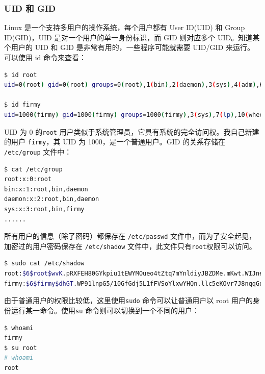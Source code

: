 \subsubsection{UID 和 GID}
\indent \setlength{\parindent}{2em}
\indent Linux 是一个支持多用户的操作系统，每个用户都有 User ID(UID) 和 Group ID(GID)，UID 是对一个用户的单一身份标识，而 GID 则对应多个 UID。知道某个用户的 UID 和 GID 是非常有用的，一些程序可能就需要 UID/GID 来运行。可以使用 id 命令来查看：
\begin{lstlisting}[language=bash, style=customStyleBashDark, caption=查看uid]
$ id root
uid=0(root) gid=0(root) groups=0(root),1(bin),2(daemon),3(sys),4(adm),6(disk),10(wheel),19(log)

$ id firmy
uid=1000(firmy) gid=1000(firmy) groups=1000(firmy),3(sys),7(lp),10(wheel),90(network),91(video),93(optical),95(storage),96(scanner),98(power),56(bumblebee)
\end{lstlisting}

\indent UID 为 0 的\verb+root+ 用户类似于系统管理员，它具有系统的完全访问权。我自己新建的用户 \verb+firmy+，其 UID 为 1000，是一个普通用户。GID 的关系存储在 \verb+/etc/group+ 文件中：
\begin{lstlisting}[language=bash, style=customStyleBashDark, caption=查看gid]
$ cat /etc/group
root:x:0:root
bin:x:1:root,bin,daemon
daemon:x:2:root,bin,daemon
sys:x:3:root,bin,firmy
......
\end{lstlisting}

\indent 所有用户的信息（除了密码）都保存在 \verb+/etc/passwd+ 文件中，而为了安全起见，加密过的用户密码保存在 \verb+/etc/shadow+ 文件中，此文件只有\verb+root+权限可以访问。

\begin{lstlisting}[language=bash, style=customStyleBashDark, caption=查看shadow+文件]
$ sudo cat /etc/shadow
root:$6$root$wvK.pRXFEH80GYkpiu1tEWYMOueo4tZtq7mYnldiyJBZDMe.mKwt.WIJnehb4bhZchL/93Oe1ok9UwxYf79yR1:17264::::::
firmy:$6$firmy$dhGT.WP91lnpG5/10GfGdj5L1fFVSoYlxwYHQn.llc5eKOvr7J8nqqGdVFKykMUSDNxix5Vh8zbXIapt0oPd8.:17264:0:99999:7:::

\end{lstlisting}

\indent 由于普通用户的权限比较低，这里使用\verb+sudo+ 命令可以让普通用户以 root 用户的身份运行某一命令。使用\verb+su+ 命令则可以切换到一个不同的用户：
\begin{lstlisting}[language=bash, style=customStyleBashDark, caption=切换用户]
$ whoami
firmy
$ su root
# whoami
root
\end{lstlisting}


